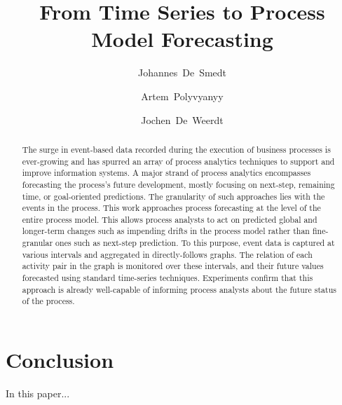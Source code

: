 \documentclass{svproc}
\begin{document}
\mainmatter      
%
\title{From Time Series to Process Model Forecasting}
%
%
\author{Johannes~De~Smedt \and Artem~Polyvyanyy \and Jochen~De~Weerdt}
%
%
\maketitle              

\begin{abstract}
The surge in event-based data recorded during the execution of business processes is ever-growing and has spurred an array of process analytics techniques to support and improve information systems.
A major strand of process analytics encompasses forecasting the process's future development, mostly focusing on next-step, remaining time, or goal-oriented predictions.
The granularity of such approaches lies with the events in the process.
This work approaches process forecasting at the level of the entire process model.
This allows process analysts to act on predicted global and longer-term changes such as impending drifts in the process model rather than fine-granular ones such as next-step prediction.
To this purpose, event data is captured at various intervals and aggregated in directly-follows graphs.
The relation of each activity pair in the graph is monitored over these intervals, and their future values forecasted using standard time-series techniques.
Experiments confirm that this approach is already well-capable of informing process analysts about the future status of the process.
\end{abstract}
%







\section{Conclusion}\label{sec:conclusion}
In this paper...



\end{document}
